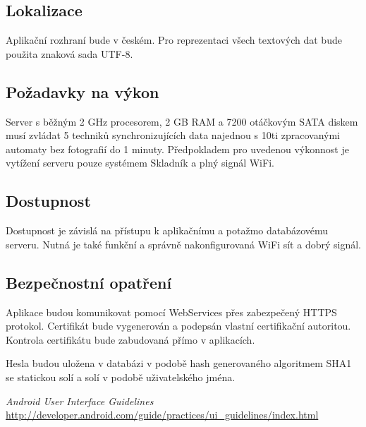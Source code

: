\documentclass[a4paper,10pt]{article}
\begin{document}
\subsection{Lokalizace}
Aplikační rozhraní bude v českém. Pro reprezentaci všech textových dat bude použita znaková sada UTF-8.

\subsection{Požadavky na výkon}
Server s běžným 2 GHz procesorem, 2 GB RAM a 7200 otáčkovým SATA diskem musí zvládat 5 techniků synchronizujících data najednou s 10ti zpracovanými automaty bez fotografií do 1 minuty. Předpokladem pro uvedenou výkonnost je vytížení serveru pouze systémem Skladník a plný signál WiFi.

\subsection{Dostupnost}
Dostupnost je závislá na přístupu k aplikačnímu a potažmo databázovému serveru. Nutná je také funkční a správně nakonfigurovaná WiFi sít a dobrý signál.

\subsection{Bezpečnostní opatření}
Aplikace budou komunikovat pomocí WebServices přes zabezpečený HTTPS protokol. Certifikát bude vygenerován a podepsán vlastní certifikační autoritou. Kontrola certifikátu bude zabudovaná přímo v aplikacích.

Hesla budou uložena v databázi v podobě hash generovaného algoritmem SHA1 se statickou solí a solí v podobě uživatelského jména.

\begin{thebibliography}{1}
	{\em Android User Interface Guidelines}	\url{http://developer.android.com/guide/practices/ui_guidelines/index.html}
\end{thebibliography}
\end{document}
